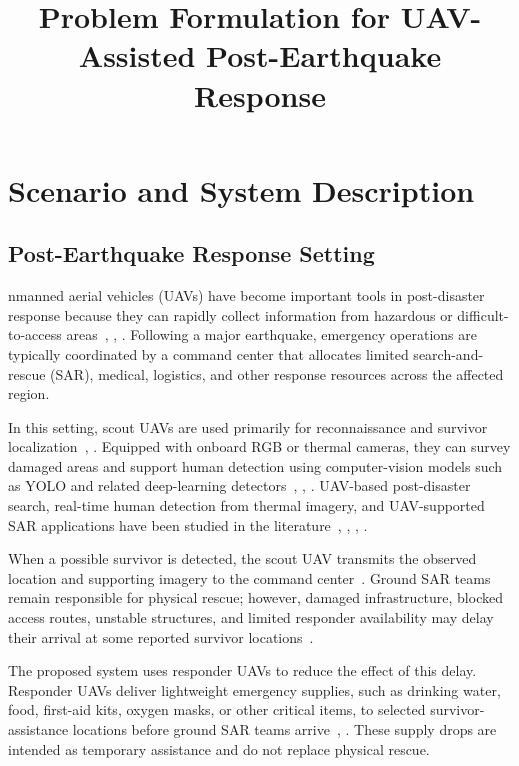 \documentclass[conference]{IEEEtran}
\title{Problem Formulation for UAV-Assisted Post-Earthquake Response}
\author{\IEEEauthorblockN{Working Thesis Draft}}
\begin{document}
\maketitle

\section{Scenario and System Description}

\subsection{Post-Earthquake Response Setting}

nmanned aerial vehicles (UAVs) have become important tools in post-disaster response because they can rapidly collect information from hazardous or difficult-to-access areas~\cite{ref_uav_disaster_survey}, \cite{ref_sar_survey}, \cite{ref_pdsr}. Following a major earthquake, emergency operations are typically coordinated by a command center that allocates limited search-and-rescue (SAR), medical, logistics, and other response resources across the affected region.

In this setting, scout UAVs are used primarily for reconnaissance and survivor localization~\cite{ref_pdsr}, \cite{ref_sar_survey}. Equipped with onboard RGB or thermal cameras, they can survey damaged areas and support human detection using computer-vision models such as YOLO and related deep-learning detectors~\cite{ref_thermal_survivor}, \cite{ref_yolo_sar}, \cite{ref_night_human}. UAV-based post-disaster search, real-time human detection from thermal imagery, and UAV-supported SAR applications have been studied in the literature~\cite{ref_pdsr}, \cite{ref_thermal_survivor}, \cite{ref_yolo_sar}, \cite{ref_night_human}.

When a possible survivor is detected, the scout UAV transmits the observed location and supporting imagery to the command center~\cite{ref_yolo_sar}. Ground SAR teams remain responsible for physical rescue; however, damaged infrastructure, blocked access routes, unstable structures, and limited responder availability may delay their arrival at some reported survivor locations~\cite{ref_sar_survey}.

The proposed system uses responder UAVs to reduce the effect of this delay. Responder UAVs deliver lightweight emergency supplies, such as drinking water, food, first-aid kits, oxygen masks, or other critical items, to selected survivor-assistance locations before ground SAR teams arrive~\cite{ref_sar_survey}, \cite{ref_delivery_survey}. These supply drops are intended as temporary assistance and do not replace physical rescue.
\end{document}
